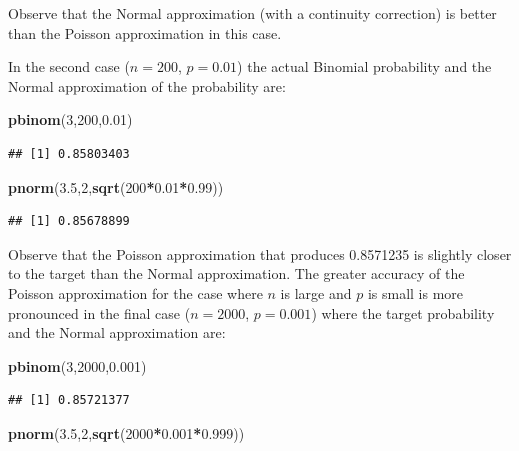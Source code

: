 \documentclass[]{krantz}
\makeatletter
\newenvironment{Shaded}{\begin{snugshade}}{\end{snugshade}}
\newcommand{\DecValTok}[1]{\textcolor[rgb]{0.00,0.00,0.81}{#1}}
\newcommand{\FloatTok}[1]{\textcolor[rgb]{0.00,0.00,0.81}{#1}}
\newcommand{\KeywordTok}[1]{\textcolor[rgb]{0.13,0.29,0.53}{\textbf{#1}}}
\newcommand{\NormalTok}[1]{#1}
\newcommand{\OperatorTok}[1]{\textcolor[rgb]{0.81,0.36,0.00}{\textbf{#1}}}
\newenvironment{kframe}{%
\medskip{}
\setlength{\fboxsep}{.8em}
 \def\at@end@of@kframe{}%
 \ifinner\ifhmode%
  \def\at@end@of@kframe{\end{minipage}}%
  \begin{minipage}{\columnwidth}%
 \fi\fi%
 \def\FrameCommand##1{\hskip\@totalleftmargin \hskip-\fboxsep
 \colorbox{shadecolor}{##1}\hskip-\fboxsep
     \hskip-\linewidth \hskip-\@totalleftmargin \hskip\columnwidth}%
 \MakeFramed {\advance\hsize-\width
   \@totalleftmargin\z@ \linewidth\hsize
   \@setminipage}}%
 {\par\unskip\endMakeFramed%
 \at@end@of@kframe}
\renewenvironment{Shaded}{\begin{kframe}}{\end{kframe}}
\theoremstyle{definition}
\theoremstyle{definition}
\theoremstyle{definition}
\theoremstyle{remark}
\makeatother
\begin{document}
Observe that the Normal approximation (with a continuity correction) is
better than the Poisson approximation in this case.

In the second case (\(n=200\), \(p=0.01\)) the actual Binomial probability
and the Normal approximation of the probability are:

\begin{Shaded}
\begin{Highlighting}[]
\KeywordTok{pbinom}\NormalTok{(}\DecValTok{3}\NormalTok{,}\DecValTok{200}\NormalTok{,}\FloatTok{0.01}\NormalTok{)}
\end{Highlighting}
\end{Shaded}

\begin{verbatim}
## [1] 0.85803403
\end{verbatim}

\begin{Shaded}
\begin{Highlighting}[]
\KeywordTok{pnorm}\NormalTok{(}\FloatTok{3.5}\NormalTok{,}\DecValTok{2}\NormalTok{,}\KeywordTok{sqrt}\NormalTok{(}\DecValTok{200}\OperatorTok{*}\FloatTok{0.01}\OperatorTok{*}\FloatTok{0.99}\NormalTok{))}
\end{Highlighting}
\end{Shaded}

\begin{verbatim}
## [1] 0.85678899
\end{verbatim}

Observe that the Poisson approximation that produces 0.8571235 is
slightly closer to the target than the Normal approximation. The greater
accuracy of the Poisson approximation for the case where \(n\) is large
and \(p\) is small is more pronounced in the final case (\(n=2000\),
\(p=0.001\)) where the target probability and the Normal approximation
are:

\begin{Shaded}
\begin{Highlighting}[]
\KeywordTok{pbinom}\NormalTok{(}\DecValTok{3}\NormalTok{,}\DecValTok{2000}\NormalTok{,}\FloatTok{0.001}\NormalTok{)}
\end{Highlighting}
\end{Shaded}

\begin{verbatim}
## [1] 0.85721377
\end{verbatim}

\begin{Shaded}
\begin{Highlighting}[]
\KeywordTok{pnorm}\NormalTok{(}\FloatTok{3.5}\NormalTok{,}\DecValTok{2}\NormalTok{,}\KeywordTok{sqrt}\NormalTok{(}\DecValTok{2000}\OperatorTok{*}\FloatTok{0.001}\OperatorTok{*}\FloatTok{0.999}\NormalTok{))}
\end{Highlighting}
\end{Shaded}
\end{document}
